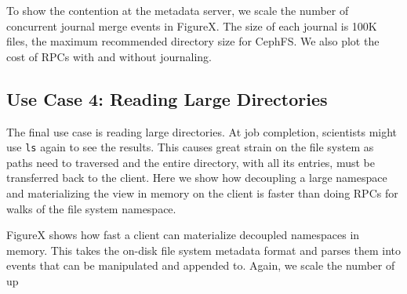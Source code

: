 To show the contention at the metadata server, we scale the number of
concurrent journal merge events in FigureX. The size of each journal is 100K
files, the maximum recommended directory size for CephFS. We also plot the cost
of RPCs with and without journaling.

\subsection{Use Case 4: Reading Large Directories} 

The final use case is reading large directories. At job completion, scientists
might use \texttt{ls} again to see the results. This causes great strain on the
file system as paths need to traversed and the entire directory, with all its
entries, must be transferred back to the client. Here we show how decoupling a
large namespace and materializing the view in memory on the client is faster
than doing RPCs for walks of the file system namespace.

FigureX shows how fast a client can materialize decoupled namespaces in memory.
This takes the on-disk file system metadata format and parses them into events
that can be manipulated and appended to. Again, we scale the number of up
